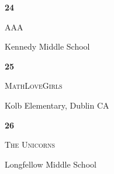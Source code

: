 \documentclass[extrafontsizes,30pt]{memoir}
\begin{document}
\renewcommand{\TeamID}{24}
\renewcommand{\TeamName}{AAA}
\renewcommand{\SchoolName}{Kennedy Middle School}

\begin{center}
\mbox{}
\vspace{1in}

{\Huge \textbf{ \TeamID}}

\vspace{1in}

{\Large \textsc{\TeamName}}

\vspace{1in}

{\large \SchoolName}
\end{center}

\newpage



\renewcommand{\TeamID}{25}
\renewcommand{\TeamName}{MathLoveGirls}
\renewcommand{\SchoolName}{Kolb Elementary, Dublin CA}

\begin{center}
\mbox{}
\vspace{1in}

{\Huge \textbf{ \TeamID}}

\vspace{1in}

{\Large \textsc{\TeamName}}

\vspace{1in}

{\large \SchoolName}
\end{center}

\newpage



\renewcommand{\TeamID}{26}
\renewcommand{\TeamName}{The Unicorns}
\renewcommand{\SchoolName}{Longfellow Middle School}

\begin{center}
\mbox{}
\vspace{1in}

{\Huge \textbf{ \TeamID}}

\vspace{1in}

{\Large \textsc{\TeamName}}

\vspace{1in}

{\large \SchoolName}
\end{center}

\newpage



\renewcommand{\TeamID}{27}
\renewcommand{\TeamName}{Macris}
\renewcommand{\SchoolName}{Macris School}
\end{document}
